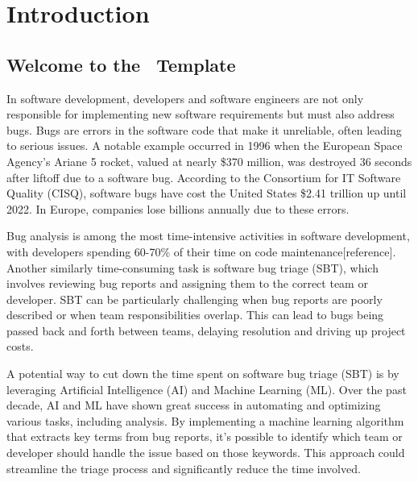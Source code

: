 
%

\chapter{Introduction}
\label{cha:introduction}


\section{Welcome to the \novathesis\ Template}
\label{sec:if_you_use_this_template}

In software development, developers and software engineers are not only responsible for implementing new software requirements but must also address bugs. Bugs are errors in the software code that make it unreliable, often leading to serious issues. A notable example occurred in 1996 when the European Space Agency’s Ariane 5 rocket, valued at nearly \$370 million, was destroyed 36 seconds after liftoff due to a software bug. According to the Consortium for IT Software Quality (CISQ), software bugs have cost the United States \$2.41 trillion up until 2022. In Europe, companies lose billions annually due to these errors. 

Bug analysis is among the most time-intensive activities in software development, with developers spending 60-70\% of their time on code maintenance[reference]. Another similarly time-consuming task is software bug triage (SBT), which involves reviewing bug reports and assigning them to the correct team or developer. SBT can be particularly challenging when bug reports are poorly described or when team responsibilities overlap. This can lead to bugs being passed back and forth between teams, delaying resolution and driving up project costs.

A potential way to cut down the time spent on software bug triage (SBT) is by leveraging Artificial Intelligence (AI) and Machine Learning (ML). Over the past decade, AI and ML have shown great success in automating and optimizing various tasks, including analysis. By implementing a machine learning algorithm that extracts key terms from bug reports, it's possible to identify which team or developer should handle the issue based on those keywords. This approach could streamline the triage process and significantly reduce the time involved.



